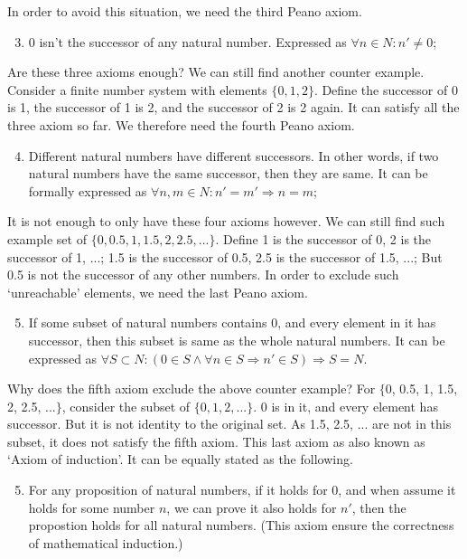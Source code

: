 \documentclass[UTF8]{article}
\begin{document}
In order to avoid this situation, we need the third Peano axiom.

\begin{enumerate}
  \setcounter{enumi}{2}
  \item 0 isn't the successor of any natural number. Expressed as $\forall n \in N: n' \neq 0$;
\end{enumerate}

Are these three axioms enough? We can still find another counter example. Consider a finite number system with elements $\{0, 1, 2\}$. Define the successor of 0 is 1, the successor of 1 is 2, and the successor of 2 is 2 again. It can satisfy all the three axiom so far. We therefore need the fourth Peano axiom.

\begin{enumerate}
  \setcounter{enumi}{3}
  \item Different natural numbers have different successors. In other words, if two natural numbers have the same successor, then they are same. It can be formally expressed as $\forall n, m \in N: n' = m' \Rightarrow n = m$;
\end{enumerate}

It is not enough to only have these four axioms however. We can still find such example set of $\{0, 0.5, 1, 1.5, 2, 2.5, ...\}$. Define 1 is the successor of 0, 2 is the successor of 1, ...; 1.5 is the successor of 0.5, 2.5 is the successor of 1.5, ...; But 0.5 is not the successor of any other numbers. In order to exclude such `unreachable' elements, we need the last Peano axiom.

\begin{enumerate}
  \setcounter{enumi}{4}
  \item If some subset of natural numbers contains 0, and every element in it has successor, then this subset is same as the whole natural numbers. It can be expressed as $\forall S \subset N: (0 \in S \land \forall n \in S \Rightarrow n' \in S) \Rightarrow S = N$.
\end{enumerate}

Why does the fifth axiom exclude the above counter example? For $\{$0, 0.5, 1, 1.5, 2, 2.5, ...$\}$, consider the subset of $\{0, 1, 2, ...\}$. 0 is in it, and every element has successor. But it is not identity to the original set. As 1.5, 2.5, ... are not in this subset, it does not satisfy the fifth axiom. This last axiom as also known as `Axiom of induction'. It can be equally stated as the following.

\begin{enumerate}
  \setcounter{enumi}{4}
  \item For any proposition of natural numbers, if it holds for 0, and when assume it holds for some number $n$, we can prove it also holds for $n'$, then the propostion holds for all natural numbers. (This axiom ensure the correctness of mathematical induction.)
\end{enumerate}
\end{document}
